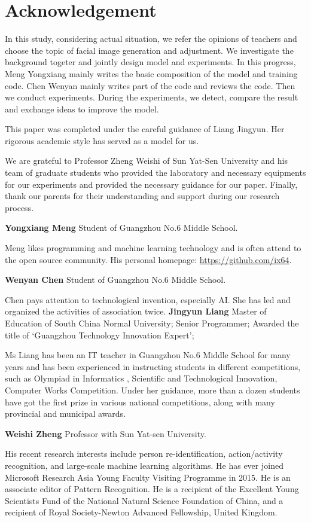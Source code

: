 \section*{Acknowledgement}

In this study, considering actual situation, we refer the opinions of teachers and choose the topic of facial image generation and adjustment. We investigate the background togeter and jointly design model and experiments. In this progress, Meng Yongxiang mainly writes the basic composition of the model and training code. Chen Wenyan mainly writes part of the code and reviews the code. Then we conduct experiments. During the experiments, we detect, compare the result and exchange ideas to improve the model.

This paper was completed under the careful guidance of Liang Jingyun. Her rigorous academic style has served as a model for us.

We are grateful to Professor Zheng Weishi of Sun Yat-Sen University and his team of graduate students who provided the laboratory and necessary equipments for our experiments and provided the necessary guidance for our paper.
Finally, thank our parents for their understanding and support during our research process.

\vspace{4ex}


\textbf{Yongxiang Meng}  Student of Guangzhou No.6 Middle School.

Meng likes programming and machine learning technology and is often attend to the open source community. His personal homepage: \url{https://github.com/ix64}.


\textbf{Wenyan Chen}  Student of Guangzhou No.6 Middle School.

Chen pays attention to technological invention, especially AI. She has led and organized the activities of association twice. 
\textbf{Jingyun Liang}  Master of Education of South China Normal University;
Senior Programmer;
Awarded the title of ‘Guangzhou Technology Innovation Expert’;

Ms Liang has been an IT teacher in Guangzhou No.6 Middle School for many years and has been experienced in instructing students in different competitions, such as Olympiad in Informatics , Scientific and Technological Innovation, Computer Works Competition. Under her guidance, more than a dozen students have got the first prize in various national competitions, along with many provincial and municipal awards.


\textbf{Weishi Zheng}  Professor with Sun Yat-sen University.

His recent research interests include person re-identification, action/activity recognition, and large-scale machine learning algorithms.
He has ever joined Microsoft Research Asia Young Faculty Visiting Programme in 2015.
He is an associate editor of Pattern Recognition.
He is a recipient of the Excellent Young Scientists Fund of the National Natural Science Foundation of China,
    and a recipient of Royal Society-Newton Advanced Fellowship, United Kingdom.

